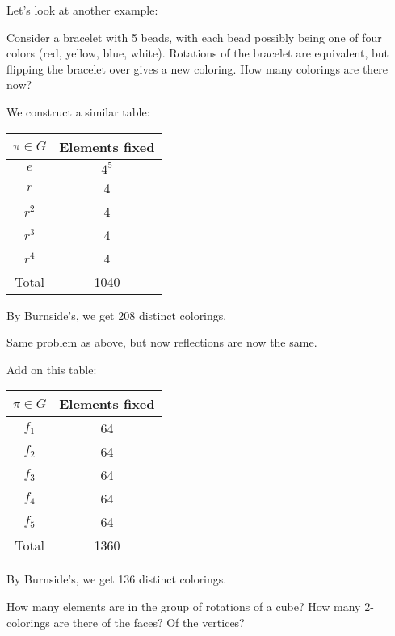\documentclass[11pt,twosided]{article}
\begin{document}
Let's look at another example: 
\begin{problem}
Consider a bracelet with 5 beads, with each bead possibly being one of four colors (red, yellow, blue, white). Rotations of the bracelet are equivalent, but flipping the bracelet over gives a new coloring. How many colorings are there now? 
\end{problem}

\begin{solution}
We construct a similar table: 
\begin{center}
\begin{tabular}{c|c}
$\pi \in G$ & Elements fixed  \\ \hline 
$e$ & $4^5$ \\
$r$ & 4 \\
$r^2$ & 4 \\
$r^3$ & 4 \\
$r^4$ & 4 \\ \hline
Total & 1040
\end{tabular}
\end{center}
By Burnside's, we get 208 distinct colorings. 
\end{solution}

\begin{problem}
Same problem as above, but now reflections are now the same. 
\end{problem}

\begin{solution}
Add on this table: 
\begin{center}
\begin{tabular}{c|c}
$\pi \in G$ & Elements fixed  \\ \hline 
$f_1$ & 64 \\
$f_2$ & 64 \\
$f_3$ & 64 \\
$f_4$ & 64 \\
$f_5$ & 64 \\ \hline
Total & 1360
\end{tabular}
\end{center}
By Burnside's, we get 136 distinct colorings. 
\end{solution}

\begin{problem}
How many elements are in the group of rotations of a cube? How many 2-colorings are there of the faces? Of the vertices? 
\end{problem}
\end{document}

